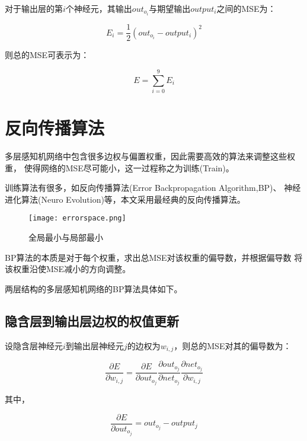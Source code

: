 \documentclass[forprint]{WHUBachelor}
\begin{document}
    对于输出层的第$i$个神经元，其输出$out_{o_i}$与期望输出$output_i$之间的MSE为：

    \begin{equation}
      E_i=\frac{1}{2} (out_{o_i}-output_i)^2
    \end{equation}

    则总的MSE可表示为：

    \begin{equation}
      E=\sum_{i=0}^{9}{E_i}
    \end{equation}

  \section{反向传播算法}

    多层感知机网络中包含很多边权与偏置权重，因此需要高效的算法来调整这些权重，
    使得网络的MSE尽可能小，这一过程称之为训练(Train)。

    训练算法有很多，如反向传播算法(Error Backpropagation Algorithm,BP)、
    神经进化算法(Neuro Evolution)等，本文采用最经典的反向传播算法。

    \begin{figure}[ht]
      \centering
        \texttt{[image: errorspace.png]}
        \caption{全局最小与局部最小}
        \label{fig:3}
    \end{figure}

    BP算法的本质是对于每个权重，求出总MSE对该权重的偏导数，并根据偏导数
    将该权重沿使MSE减小的方向调整。

    两层结构的多层感知机网络的BP算法具体如下。

    \subsection{隐含层到输出层边权的权值更新}
      
      设隐含层神经元$i$到输出层神经元$j$的边权为$w_{i,j}$，则总的MSE对其的偏导数为：

      \begin{equation}
        \frac{\partial{E}}{\partial{w_{i,j}}}=
        \frac{\partial{E}}{\partial{out_{o_j}}}
        \frac{\partial{out_{o_j}}}{\partial{net_{o_j}}}
        \frac{\partial{net_{o_j}}}{\partial{w_{i,j}}}
        \label{equa11}
      \end{equation}

      其中，

      \begin{equation}
        \frac{\partial{E}}{\partial{out_{o_j}}}
        =out_{o_j}-output_j
        \label{equa12}
      \end{equation}
\end{document}
